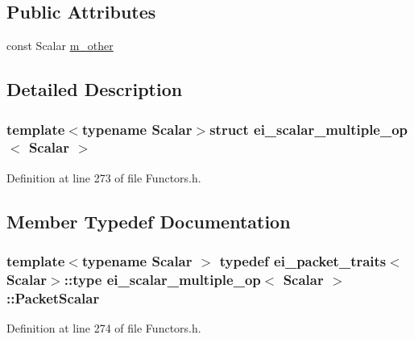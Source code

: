 \subsection*{Public Attributes}
\begin{DoxyCompactItemize}
\item 
const Scalar \hyperlink{structei__scalar__multiple__op_a73883bda19d9ddac9f20e61332e25897}{m\-\_\-other}
\end{DoxyCompactItemize}


\subsection{Detailed Description}
\subsubsection*{template$<$typename Scalar$>$struct ei\-\_\-scalar\-\_\-multiple\-\_\-op$<$ Scalar $>$}



Definition at line 273 of file Functors.\-h.



\subsection{Member Typedef Documentation}
\hypertarget{structei__scalar__multiple__op_ab5a0b096d168a95f9972d26439c15488}{
\subsubsection[{Packet\-Scalar}]{\setlength{\rightskip}{0pt plus 5cm}template$<$typename Scalar $>$ typedef {\bf ei\-\_\-packet\-\_\-traits}$<$Scalar$>$\-::{\bf type} {\bf ei\-\_\-scalar\-\_\-multiple\-\_\-op}$<$ Scalar $>$\-::{\bf Packet\-Scalar}}}\label{structei__scalar__multiple__op_ab5a0b096d168a95f9972d26439c15488}


Definition at line 274 of file Functors.\-h.



